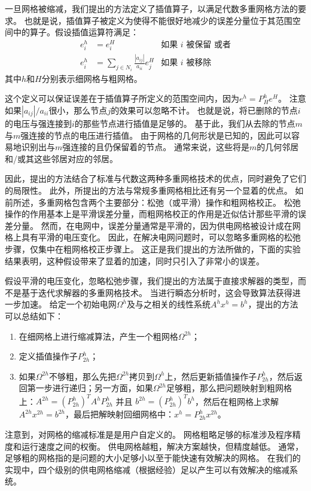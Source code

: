 一旦网格被缩减，我们提出的方法定义了插值算子，以满足代数多重网格方法的要求。 也就是说，插值算子被定义为使得不能很好地减少的误差分量位于其范围空间中的算子。假设插值运算符满足：
\begin{align}
e^h_i & =e^H_i &\text{如果 }i\text{ 被保留 或者} \\
e^h_i & =\sum_{j\in N_i} \frac{|a_{ij}|}{a_{ii}} e^H_j &\text{如果 }i\text{ 被移除}
\end{align}
其中$h$和$H$分别表示细网格与粗网格。

这个定义可以保证误差在于插值算子所定义的范围空间内，因为$e^h = P_H^he^H$。 注意如果$|a_{ij}|/a_{ii}$很小，那么节点$j$的效果可以忽略不计。 也就是说，将已删除的节点$i$的电压与强连接到$i$的那些节点进行插值是足够的。 基于此，我们从去除的节点$m$与$m$强连接的节点的电压进行插值。 由于网格的几何形状是已知的，因此可以容易地识别出与$m$强连接的且仍保留着的节点。 通常来说，这些将是$m$的几何邻居和/或其这些邻居对应的邻居。

因此，提出的方法结合了标准与代数这两种多重网格技术的优点，同时避免了它们的局限性。 此外，所提出的方法与常规多重网格相比还有另一个显着的优点。 如前所述，多重网格包含两个主要部分：松弛（或平滑）操作和粗网格校正。 松弛操作的作用基本上是平滑误差分量，而粗网格校正的作用是近似估计那些平滑的误差分量。 然而，在电网中，误差分量通常是平滑的，因为供电网格被设计成在网格上具有平滑的电压变化。 因此，在解决电网问题时，可以忽略多重网格的松弛步骤，仅集中在粗网格校正步骤上。 这正是我们提出的方法所做的，下面的实验结果表明，这种假设带来了显着的加速，同时只引入了非常小的误差。

假设平滑的电压变化，忽略松弛步骤，我们提出的方法属于直接求解器的类型，而不是基于迭代求解器的多重网格技术。 当进行瞬态分析时，这会导致算法获得进一步加速。 给定一个初始电网$\Omega^h$及与之相关的线性系统$A^hx^h = b^h$，提出的方法可以总结如下：
\begin{enumerate}
\item 在细网格上进行缩减算法，产生一个粗网格$\Omega^{2h}$；
\item 定义插值操作子$P_{2h}^h$；
\item 如果$\Omega^{2h}$不够粗，那么先把$\Omega^{2h}$拷贝到$\Omega^h$上，然后更新插值操作子$P_{2h}^h$，然后返回第一步进行递归；另一方面，如果$\Omega^{2h}$足够粗，那么把问题映射到粗网格上：$A^{2h}=(P_{2h}^h)^TA^hP^h_{2h}$ 并且
$b^{2h}=(P^h_{2h})^Tb^h$，然后在粗网格上求解$A^{2h}x^{2h}=b^{2h}$，最后把解映射回细网格中：$x^h=P^h_{2h}x^{2h}$。
\end{enumerate}

注意到，对网格的缩减标准是是用户自定义的。 网格粗略足够的标准涉及程序精度和运行速度之间的权衡。 供电网格越粗，解决方案越快，但精度越低。 通常，足够粗的网格指的是问题的大小足够小以至于能快速有效解决的网格。 在我们的实现中，四个级别的供电网格缩减（根据经验）足以产生可以有效解决的缩减系统。

